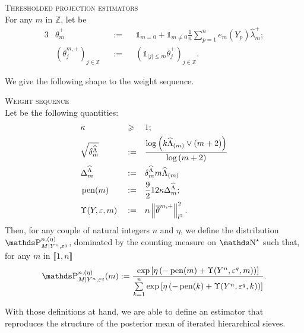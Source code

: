 \begin{de}{\textsc{Thresholded projection estimators} \\}\label{DE_FREQ_CIRCDECONV_UNKNOWN_IID_THRESHOLDEDPROJEST}
For any $m$ in $\mathds{Z}$, let be
\begin{alignat*}{3}
& \overline{\theta}_{m}^{+} && := && \mathds{1}_{m = 0} + \mathds{1}_{m \neq 0} \frac{1}{n}\sum\limits_{p = 1}^{n} e_{m}(Y_{p}) \widehat{\lambda}_{m}^{+};\\
& \left( \overline{\theta}^{m, +}_{j} \right)_{j \in \mathds{Z}} && := &&\left(\mathds{1}_{\vert j \vert \leq m} \overline{\theta}^{+}_{j}\right)_{j \in \mathds{Z}}.
\end{alignat*}
\end{de}

We give the following shape to the weight sequence.

\begin{de}{\textsc{Weight sequence} \\}\label{DE_FREQ_CIRCDECONV_UNKNOWN_IID_WEIGHT}
Let be the following quantities:
\begin{alignat*}{3}
& \kappa && \geqslant && 1;\\
& \sqrt{\delta^{\widehat{\Lambda}}_{m}} && := && \frac{\log\left(k \widehat{\Lambda}_{(m)} \vee \left(m + 2\right)\right)}{\log\left(m + 2\right)}\\
& \Delta^{\widehat{\Lambda}}_{m} && := && \delta^{\widehat{\Lambda}}_{m} m \widehat{\Lambda}_{(m)}\\
& \operatorname{pen}(m) && := && \frac{9}{2} 12 \kappa \Delta^{\widehat{\Lambda}}_{m};\\
& \Upsilon(Y, \varepsilon, m) && := && n \left\Vert \overline{\theta}^{m, +} \right\Vert_{l^{2}}^{2}.
\end{alignat*}
Then, for any couple of natural integers $n$ and $\eta$, we define the distribution $\P_{M \vert Y^{n}, \epsilon^{q}}^{n, (\eta)}$, dominated by the counting measure on $\N^{\star}$ such that, for any $m$ in $\llbracket 1, n \rrbracket$
\[\P_{M \vert Y^{n}, \epsilon^{q}}^{n, (\eta)}(m) := \frac{\exp\left[\eta\left(- \pen(m) + \Upsilon(Y^{n}, \epsilon^{q}, m)\right)\right]}{\sum\limits_{k = 1}^{n} \exp\left[\eta\left(- \pen(k) + \Upsilon(Y^{n}, \epsilon^{q}, k)\right)\right]}.\]
\end{de}

With those definitions at hand, we are able to define an estimator that reproduces the structure of the posterior mean of iterated hierarchical sieves.

